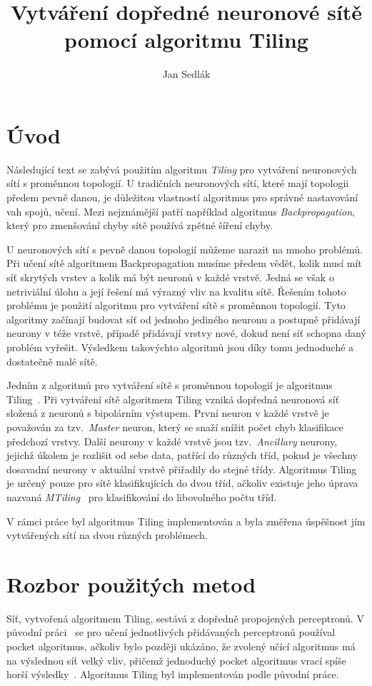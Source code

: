 \documentclass[a4paper, 11pt]{article}
\author{Jan Sedlák}
\title{Vytváření dopředné neuronové sítě pomocí algoritmu Tiling}
\begin{document}
\maketitle
\section*{Úvod}
Následující text se zabývá použitím algoritmu \emph{Tiling} pro vytváření neuronových sítí s proměnnou topologií. U tradičních neuronových sítí, které mají topologii předem pevně danou, je důležitou vlastností algoritmus pro správné nastavování vah spojů, učení. Mezi nejznámější patří například algoritmus \emph{Backpropagation}, který pro zmenšování chyby sítě používá zpětné šíření chyby.

U neuronových sítí s pevně danou topologií můžeme narazit na mnoho problémů. Při učení sítě algoritmem Backpropagation musíme předem vědět, kolik musí mít síť skrytých vrstev a kolik má být neuronů v každé vrstvě. Jedná se však o netriviální úlohu a její řešení má výrazný vliv na kvalitu sítě. Řešením tohoto problému je použití algoritmu pro vytváření sítě s proměnnou topologií. Tyto algoritmy začínají budovat síť od jednoho jediného neuronu a postupně přidávají neurony v téže vrstvě, případě při\-dá\-va\-jí vrstvy nové, dokud není síť schopna daný problém vyřešit. Výsledkem takovýchto algoritmů jsou díky tomu jednoduché a dostatečně malé sítě.

Jedním z algoritmů pro vytváření sítě s proměnnou topologií je algoritmus Tiling~\cite{mezard}. Při vytváření sítě algoritmem Tiling vzniká dopředná neuronová síť složená z neuronů s bipolárním výstupem. První neuron v každé vrstvě je považován za tzv.\ \emph{Master} neuron, který se snaží snížit počet chyb klasifikace předchozí vrstvy. Další neurony v každé vrstvě jsou tzv.\ \emph{Ancillary} neurony, jejichž úkolem je rozlišit od sebe data, patřící do různých tříd, pokud je všechny dosavadní neurony v aktuální vrstvě přiřadily do stejné třídy. Algoritmus Tiling je určený pouze pro sítě klasifikujících do dvou tříd, ačkoliv existuje jeho úprava nazvaná \emph{MTiling}~\cite{mtiling} pro klasifikování do libovolného počtu tříd.

V rámci práce byl algoritmus Tiling implementován a byla změřena úspěšnost jím vytvářených sítí na dvou různých problémech.

\section*{Rozbor použitých metod}
Síť, vytvořená algoritmem Tiling, sestává z dopředně propojených per\-cep\-tro\-nů. V původní práci~\cite{mezard} se pro učení jednotlivých přidávaných perceptronů používal pocket algoritmus, ačkoliv bylo později ukázáno, že zvolený učící algoritmus má na výslednou síť velký vliv, přičemž jednoduchý pocket algoritmus vrací spíše horší výsledky~\cite{twovariants}. Algoritmus Tiling byl implementován podle původní práce.
\end{document}
